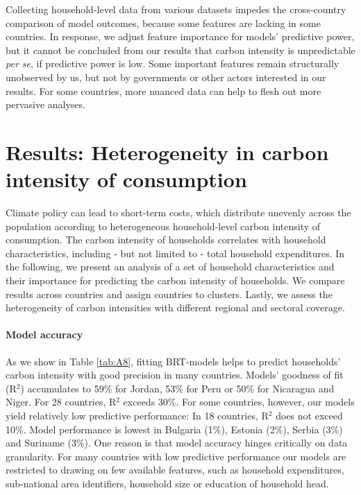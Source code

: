 \documentclass[12pt, a4paper]{article}
\begin{document}
Collecting household-level data from various datasets impedes the cross-country comparison of model outcomes, because some features are lacking in some countries. In response, we adjust feature importance for models' predictive power, but it cannot be concluded from our results that carbon intensity is unpredictable \textit{per se}, if predictive power is low. Some important features remain structurally unobserved by us, but not by governments or other actors interested in our results. For some countries, more nuanced data can help to flesh out more pervasive analyses.

\section{Results: Heterogeneity in carbon intensity of consumption} \label{sec:results}

Climate policy can lead to short-term costs, which distribute unevenly across the population according to heterogeneous household-level carbon intensity of consumption. The carbon intensity of households correlates with household characteristics, including - but not limited to - total household expenditures. In the following, we present an analysis of a set of household characteristics and their importance for predicting the carbon intensity of households. We compare results across countries and assign countries to clusters. Lastly, we assess the heterogeneity of carbon intensities with different regional and sectoral coverage.

\paragraph{Model accuracy} 
As we show in Table \ref{tab:A8}, fitting BRT-models helps to predict households' carbon intensity with good precision in many countries. Models' goodness of fit (R$^{2}$) accumulates to 59\% for Jordan, 53\% for Peru or 50\% for Nicaragua and Niger. For 28 countries, R$^{2}$ exceeds 30\%. For some countries, however, our models yield relatively low predictive performance: In 18 countries, R$^{2}$ does not exceed 10\%. Model performance is lowest in Bulgaria (1\%), Estonia (2\%), Serbia (3\%) and Suriname (3\%). One reason is that model accuracy hinges critically on data granularity. For many countries with low predictive performance our models are restricted to drawing on few available features, such as household expenditures, sub-national area identifiers, household size or education of household head.
\end{document}

